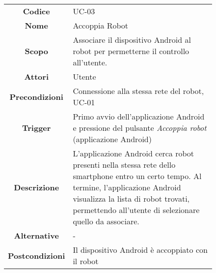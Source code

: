 \documentclass[]{article}
\begin{document}
\begin{figure}[htbp]
\centering
\begin{tabular}{|c|l|}
\hline

\textbf{Codice}
 & 
UC-03
\\

\textbf{Nome}
 & 
Accoppia Robot
\\

\textbf{Scopo}
 & 
Associare il dispositivo Android al robot per permetterne il controllo
all'utente.
\\

\textbf{Attori}
 & 
Utente
\\

\textbf{Precondizioni}
 & 
Connessione alla stessa rete del robot, UC-01
\\

\textbf{Trigger}
 & 
Primo avvio dell'applicazione Android e pressione del pulsante
\emph{Accoppia robot} (applicazione Android)
\\

\textbf{Descrizione}
 & 
L'applicazione Android cerca robot presenti nella stessa rete dello
smartphone entro un certo tempo. Al termine, l'applicazione Android
visualizza la lista di robot trovati, permettendo all'utente di
selezionare quello da associare.
\\

\textbf{Alternative}
 & 
-
\\

\textbf{Postcondizioni}
 & 
Il dispositivo Android è accoppiato con il robot
\\
\hline
\end{tabular}
\end{figure}
\end{document}
